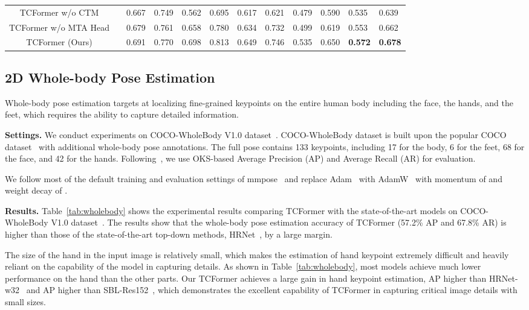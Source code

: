 \documentclass[10pt,twocolumn,letterpaper]{article}
\begin{document}
\begin{table*}[t]
\begin{center}
{\begin{tabular}{c|c|cc|cc|cc|cc|aa}
            \hline
			 TCFormer w/o CTM  &  & 0.667 & 0.749&	0.562& 0.695 &	0.617 & 0.621 &	0.479& 0.590 &	0.535 & 0.639 \\ 
			 TCFormer w/o MTA Head &  &0.679 & 0.761&0.658 &0.780 &0.634 &0.732 &0.499 &0.619 &0.553 &0.662\\ 
			 TCFormer (Ours) &  & 0.691 & 0.770 & 0.698 & 0.813 & 0.649 & 0.746 & 0.535 & 0.650 & \textbf{0.572} & \textbf{0.678} \\ 
			\hline
		\end{tabular}
		}
	\end{center}
	\vspace{-10pt}
\end{table*}


\subsection{2D Whole-body Pose Estimation}
\label{sec:human_pose}
Whole-body pose estimation targets at localizing fine-grained keypoints on the entire human body including the face, the hands, and the feet, which requires the ability to capture detailed information.


\textbf{Settings.}
We conduct experiments on COCO-WholeBody V1.0 dataset~\cite{jin2020whole}. COCO-WholeBody dataset is built upon the popular COCO dataset~\cite{lin2014microsoft} with additional whole-body pose annotations. The full pose contains 133 keypoints, including 17 for the body, 6 for the feet, 68 for the face, and 42 for the hands. Following~\cite{lin2014microsoft,jin2020whole}, we use OKS-based Average Precision (AP) and Average Recall (AR) for evaluation. 


We follow most of the default training and evaluation settings of mmpose~\cite{mmpose2020} and replace Adam~\cite{kingma2014adam} with AdamW~\cite{loshchilov2017decoupled} with momentum of  and weight decay of . 



\textbf{Results.} 
Table~\ref{tab:wholebody} shows the experimental results comparing TCFormer with the state-of-the-art models on COCO-WholeBody V1.0 dataset~\cite{jin2020whole}. 
The results show that the whole-body pose estimation accuracy of TCFormer (57.2\% AP and 67.8\% AR) is higher than those of the state-of-the-art top-down methods, \eg HRNet~\cite{sun2019deep}, by a large margin.

The size of the hand in the input image is relatively small, which makes the estimation of hand keypoint extremely difficult and heavily reliant on the capability of the model in capturing details. 
As shown in Table~\ref{tab:wholebody}, most models achieve much lower performance on the hand than the other parts.
Our TCFormer achieves a large gain in hand keypoint estimation, \ie  AP higher than HRNet-w32~\cite{sun2019deep} and  AP higher than SBL-Res152~\cite{xiao2018simple}, which demonstrates the excellent capability of TCFormer in capturing critical image details with small sizes.
\end{document}
